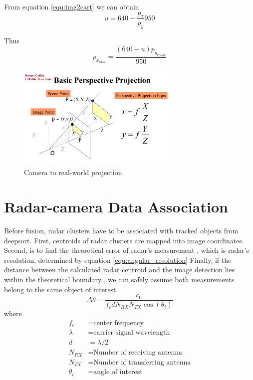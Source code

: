 From equation \ref{equ:img2cart} we can obtain
\begin{equation}\label{equ:2_img2cart2}
    u=640-\frac{p_x}{p_y}950
\end{equation}

Thus
\begin{equation}\label{equ:2_cam_px}
    p_{x_{cam}}=
    \frac
    {(640-u)p_{y_{radar}}}
    {950}
\end{equation}






\begin{figure}[hpbt]
    \centering
    \includegraphics[width=8cm]{Figures/cam_projection.png}%
    \caption{Camera to real-world projection}
    \label{fig:camera_projection}
\end{figure}
\newpage
\section{Radar-camera Data Association}\label{sec:2-association}
Before fusion, radar clusters have to be associated with tracked objects from deepsort.
First, centroids of radar clusters are mapped into image coordinates.
Second, is to find the theoretical error of radar's measurement \cite{8844649}, which is radar's resolution, determined by equation \ref*{equ:angular_resolution}
Finally, if the distance between the calculated radar centroid and the image detection lies within the theoretical boundary
, we can safely assume both measurements belong to the same object of interest.
\begin{equation}\label{equ:angular_resolution}
    \Delta \theta= \frac{c_0}{f_c d N_{RX} N_{TX} \cos(\theta _i)}
\end{equation}
where
\begin{align*}
    f_c & = \text{center frequency} \\
    \lambda & = \text{carrier signal wavelength} \\
    d & =  \lambda/2 \\
    N_{RX} & = \text{Number of receiving antenna}\\
    N_{TX}& = \text{Number of transferring antenna}\\
    \theta _i &= \text{angle of interest}
\end{align*}





